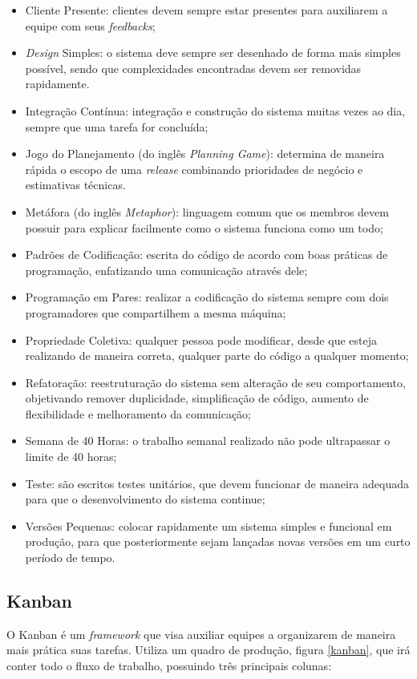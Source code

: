     \begin{itemize}
        \item Cliente Presente: clientes devem sempre estar presentes para auxiliarem a equipe com seus \textit{feedbacks};
        \item \textit{Design} Simples: o sistema deve sempre ser desenhado de forma mais simples possível, sendo que complexidades encontradas devem ser removidas rapidamente.
        \item Integração Contínua: integração e construção do sistema muitas vezes ao dia, sempre que uma tarefa
        for concluída;
        \item Jogo do Planejamento (do inglês \textit{Planning Game}): determina de maneira rápida o escopo de uma \textit{release} combinando prioridades de negócio e estimativas técnicas.
        \item Metáfora (do inglês \textit{Metaphor}): linguagem comum que os membros devem possuir para explicar facilmente como o sistema funciona como um todo;
        \item Padrões de Codificação: escrita do código de acordo com boas práticas de programação, enfatizando uma comunicação através dele;
        \item Programação em Pares: realizar a codificação do sistema sempre
        com dois programadores que compartilhem a mesma máquina;
        \item Propriedade Coletiva: qualquer pessoa pode modificar, desde que esteja realizando de maneira correta, qualquer parte do código a qualquer momento;
        \item Refatoração: reestruturação do sistema sem alteração de seu comportamento, objetivando
        remover duplicidade, simplificação de código, aumento de flexibilidade e melhoramento da comunicação;
        \item Semana de 40 Horas: o trabalho semanal realizado não pode ultrapassar o limite de 40 horas;
        \item Teste: são escritos testes unitários, que devem funcionar de maneira adequada para que
        o desenvolvimento do sistema continue;
        \item Versões Pequenas: colocar rapidamente um sistema simples e funcional em produção, para que posteriormente sejam lançadas novas versões em um curto período de tempo.
    \end{itemize}

    \subsection{Kanban}
    O Kanban \cite{radigan_2015} é um \textit{framework} que visa auxiliar equipes a organizarem de maneira mais prática suas tarefas. Utiliza um quadro de produção, figura \ref{kanban}, que irá conter todo o fluxo de trabalho, possuindo três principais colunas:

